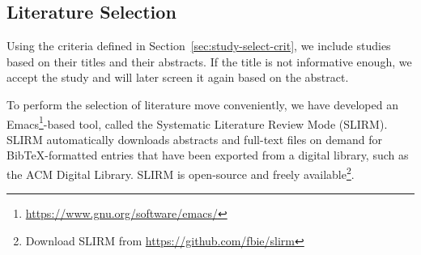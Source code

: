 \documentclass[a4paper]{article}
\begin{document}
\subsection{Literature Selection}
\label{sec:literature-selection}

Using the criteria defined in Section~\ref{sec:study-select-crit}, we
include studies based on their titles and their abstracts. If the
title is not informative enough, we accept the study and will later
screen it again based on the abstract.

To perform the selection of literature move conveniently, we have
developed an
Emacs\footnote{\url{https://www.gnu.org/software/emacs/}}-based tool,
called the Systematic Literature Review Mode (SLIRM). SLIRM
automatically downloads abstracts and full-text files on demand for
BibTeX-formatted entries that have been exported from a digital
library, such as the ACM Digital Library. SLIRM is open-source and
freely available\footnote{Download SLIRM from
  \url{https://github.com/fbie/slirm}}.
\end{document}

